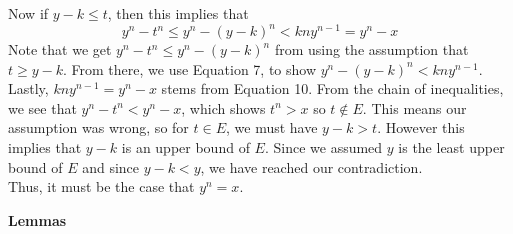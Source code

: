 \documentclass[12pt]{article}
\begin{document}
\begin{enumerate}
Now if $y-k \leq t$, then this implies that 
\begin{equation} 
y^{n}-t^{n} \leq y^{n} - (y-k)^{n} < kny^{n-1} = y^{n}-x
\end{equation}
Note that we get $y^{n}-t^{n} \leq y^{n} - (y-k)^{n}$ from using the assumption that $t \geq y-k$. From there, we use Equation 7, to show $y^{n} - (y-k)^{n} < kny^{n-1}$. Lastly, $kny^{n-1} = y^{n}-x$ stems from Equation 10. From the chain of inequalities, we see that $y^{n}-t^{n} < y^{n}-x$, which shows $t^{n} > x$ so $t \notin E$. This means our assumption was wrong, so for $t \in E$, we must have $y-k>t$. However this implies that $y-k$ is an upper bound of $E$. Since we assumed  $y$ is the least upper bound of $E$ and since $y-k<y$, we have reached our contradiction. \\ 


Thus, it must be the case that $y^{n}=x$. \\
\end{enumerate}
\textbf{Lemmas}
\end{document}
